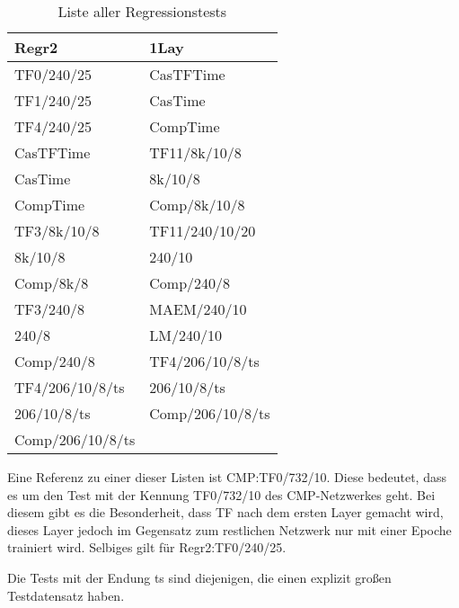 \begin{table}[!ht]
    \centering
    \begin{tabular}{l|l}
        \textbf{Regr2} & \textbf{1Lay} \\
        \hline
        TF0/240/25 & CasTFTime \\
        TF1/240/25 & CasTime \\
        TF4/240/25 & CompTime \\
        CasTFTime & TF11/8k/10/8 \\
        CasTime & 8k/10/8 \\
        CompTime & Comp/8k/10/8 \\
        TF3/8k/10/8 & TF11/240/10/20 \\
        8k/10/8 & 240/10 \\
        Comp/8k/8 & Comp/240/8 \\
        TF3/240/8 & MAEM/240/10 \\
        240/8 & LM/240/10 \\
        Comp/240/8 & TF4/206/10/8/ts \\
        TF4/206/10/8/ts & 206/10/8/ts \\
        206/10/8/ts & Comp/206/10/8/ts \\
        Comp/206/10/8/ts &
    \end{tabular}
    \caption{\label{tab:regrtests} Liste aller Regressionstests}
\end{table}

Eine Referenz zu einer dieser Listen ist CMP:TF0/732/10. Diese bedeutet, dass es um den Test mit der Kennung TF0/732/10 des CMP-Netzwerkes geht. 
Bei diesem gibt es die Besonderheit, dass TF nach dem ersten Layer gemacht wird, dieses Layer jedoch im 
Gegensatz zum restlichen Netzwerk nur mit einer Epoche trainiert wird.
Selbiges gilt für Regr2:TF0/240/25.

Die Tests mit der Endung ts sind diejenigen, die einen explizit großen Testdatensatz haben. 
